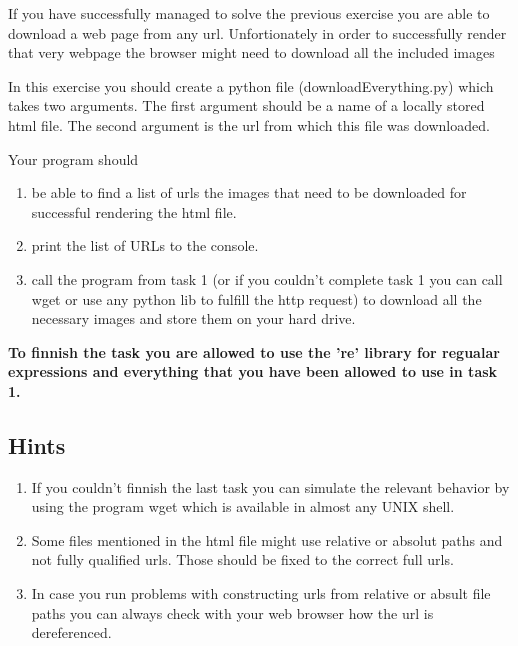 \documentclass{WeSTassignment}
\begin{document}
If you have successfully managed to solve the previous exercise you are able to download a web page from any url. Unfortionately in order to successfully render that very webpage the browser might need to download all the included images

In this exercise you should create a python file (downloadEverything.py) which takes two arguments. The first argument should be a name of a locally stored html file. The second argument is the url from which this file was downloaded.

Your program should 
\begin{enumerate}
\item be able to find a list of urls the images that need to be downloaded for successful rendering the html file.
\item print the list of URLs to the console.
\item call the program from task 1 (or if you couldn't complete task 1 you can call wget or use any python lib to fulfill the http request) to download all the necessary images and store them on your hard drive.
\end{enumerate}

\textbf{To finnish the task you are allowed to use the 're' library for regualar expressions and everything that you have been allowed to use in task 1.}

\subsection{Hints}
\begin{enumerate}
\item If you couldn't finnish the last task you can simulate the relevant behavior by using the program wget which is available in almost any UNIX shell. 
\item Some files mentioned in the html file might use relative or absolut paths and not fully qualified urls. Those should be fixed to the correct full urls. 
\item In case you run problems with constructing urls from relative or absult file paths you can always check with your web browser how the url is dereferenced. \\
\end{enumerate}
\end{document}
